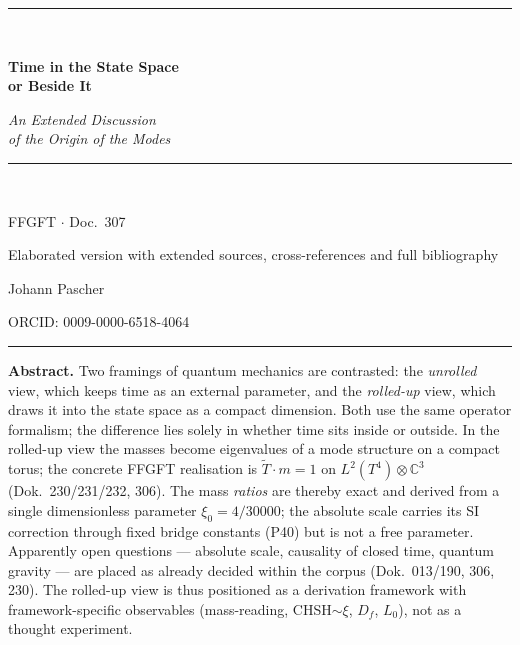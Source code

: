 \documentclass[11pt,a4paper]{article}
\begin{document}
\begin{titlepage}
\centering
\vspace*{2.2cm}
{\color{rulecol}\rule{0.5\textwidth}{0.6pt}}\\[1.4cm]
{\color{accent}\Huge\bfseries Time in the State Space\\[0.3em] or Beside It\par}
\vspace{1.0cm}
{\large\itshape An Extended Discussion\\ of the Origin of the Modes\par}
\vspace{0.6cm}
{\color{accent2}\rule{0.28\textwidth}{0.4pt}}\\[1.0cm]
{\large FFGFT $\cdot$ Doc.~307\par}
\vspace{0.5cm}
{\normalsize Elaborated version with extended sources, cross-references and full bibliography\par}
\vfill
{\large Johann Pascher\par}
\vspace{0.3cm}
{\footnotesize ORCID: 0009-0000-6518-4064\par}
\vspace{1.4cm}
{\color{rulecol}\rule{0.5\textwidth}{0.6pt}}
\vspace*{1.5cm}
\end{titlepage}

\tableofcontents
\thispagestyle{fancy}
\clearpage

\begingroup\small\noindent
\textbf{Abstract.} Two framings of quantum mechanics are contrasted: the \emph{unrolled} view, which keeps time as an external parameter, and the \emph{rolled-up} view, which draws it into the state space as a compact dimension. Both use the same operator formalism; the difference lies solely in whether time sits inside or outside. In the rolled-up view the masses become eigenvalues of a mode structure on a compact torus; the concrete FFGFT realisation is $\tilde T\cdot m = 1$ on $L^2(T^4)\otimes\mathbb{C}^3$ (Dok.~230/231/232, 306). The mass \emph{ratios} are thereby exact and derived from a single dimensionless parameter $\xi_0 = 4/30000$; the absolute scale carries its SI correction through fixed bridge constants (P40) but is not a free parameter. Apparently open questions --- absolute scale, causality of closed time, quantum gravity --- are placed as already decided within the corpus (Dok.~013/190, 306, 230). The rolled-up view is thus positioned as a derivation framework with framework-specific observables (mass-reading, CHSH$\sim\xi$, $D_f$, $L_0$), not as a thought experiment.
\par\endgroup
\end{document}
